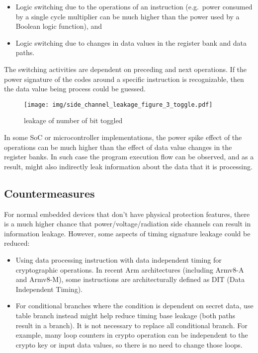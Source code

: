 \documentclass[a4paper,]{report}
\makeatletter
\providecommand{\tightlist}{%
  \setlength{\itemsep}{0pt}\setlength{\parskip}{0pt}}
\newcounter{figno}
\newenvironment{fignos:no-prefix-figure-caption}{
  \caption@ifcompatibility{}{
    \let\oldthefigure\thefigure
    \let\oldtheHfigure\theHfigure
    \renewcommand{\thefigure}{figno:\thefigno}
    \renewcommand{\theHfigure}{figno:\thefigno}
    \stepcounter{figno}
    \captionsetup{labelformat=empty}
  }
}{
  \caption@ifcompatibility{}{
    \captionsetup{labelformat=default}
    \let\thefigure\oldthefigure
    \let\theHfigure\oldtheHfigure
    \addtocounter{figure}{-1}
  }
}
\makeatother
\begin{document}
\begin{itemize}
\tightlist
\item
  Logic switching due to the operations of an instruction (e.g.~power
  consumed by a single cycle multiplier can be much higher than the
  power used by a Boolean logic function), and
\item
  Logic switching due to changes in data values in the register bank and
  data paths.
\end{itemize}

The switching activities are dependent on preceding and next operations.
If the power signature of the codes around a specific instruction is
recognizable, then the data value being process could be guessed.

\begin{fignos:no-prefix-figure-caption}

\begin{figure}
\centering
\texttt{[image: img/side\_channel\_leakage\_figure\_3\_toggle.pdf]}
\caption{leakage of number of bit toggled}
\end{figure}

\end{fignos:no-prefix-figure-caption}

In some SoC or microcontroller implementations, the power spike effect
of the operations can be much higher than the effect of data value
changes in the register banks. In such case the program execution flow
can be observed, and as a result, might also indirectly leak information
about the data that it is processing.

\hypertarget{countermeasures}{%
\subsection{Countermeasures}\label{countermeasures}}

For normal embedded devices that don't have physical protection
features, there is a much higher chance that power/voltage/radiation
side channels can result in information leakage. However, some aspects
of timing signature leakage could be reduced:

\begin{itemize}
\tightlist
\item
  Using data processing instruction with data independent timing for
  cryptographic operations. In recent Arm architectures (including
  Armv8-A and Armv8-M), some instructions are architecturally defined as
  DIT (Data Independent Timing).
\item
  For conditional branches where the condition is dependent on secret
  data, use table branch instead might help reduce timing base leakage
  (both paths result in a branch). It is not necessary to replace all
  conditional branch. For example, many loop counters in crypto
  operation can be independent to the crypto key or input data values,
  so there is no need to change those loops.
\end{itemize}
\end{document}
